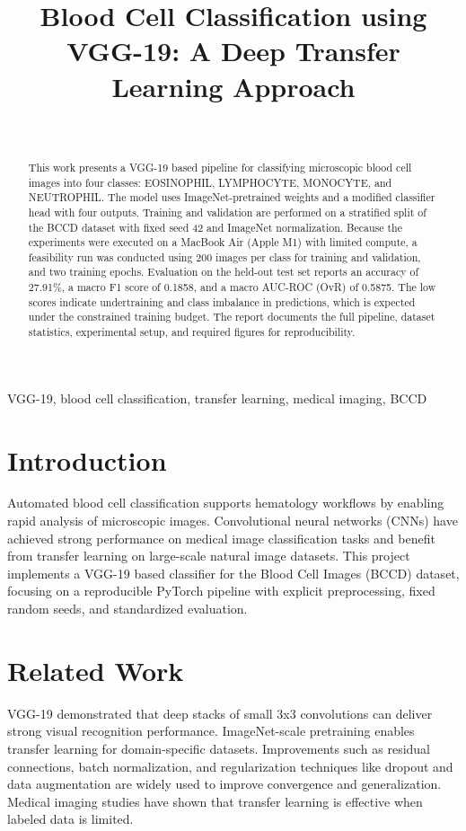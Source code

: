 \documentclass[conference]{IEEEtran}
\title{Blood Cell Classification using VGG-19: A Deep Transfer Learning Approach}
\author{\IEEEauthorblockN{Aman Verma (23bcs012), Ankit Kashyap (23bcs017), Abhishek Chauhan (23bcs003)}\\
\IEEEauthorblockA{School of Computer science and Engineering\\
Shri Mata Vaishno Devi University\\
info@smvdu.ac.in}}
\begin{document}
\maketitle

\begin{abstract}
This work presents a VGG-19 based pipeline for classifying microscopic blood cell images into four classes: EOSINOPHIL, LYMPHOCYTE, MONOCYTE, and NEUTROPHIL. The model uses ImageNet-pretrained weights and a modified classifier head with four outputs. Training and validation are performed on a stratified split of the BCCD dataset with fixed seed 42 and ImageNet normalization. Because the experiments were executed on a MacBook Air (Apple M1) with limited compute, a feasibility run was conducted using 200 images per class for training and validation, and two training epochs. Evaluation on the held-out test set reports an accuracy of 27.91\%, a macro F1 score of 0.1858, and a macro AUC-ROC (OvR) of 0.5875. The low scores indicate undertraining and class imbalance in predictions, which is expected under the constrained training budget. The report documents the full pipeline, dataset statistics, experimental setup, and required figures for reproducibility.
\end{abstract}

\begin{IEEEkeywords}
VGG-19, blood cell classification, transfer learning, medical imaging, BCCD
\end{IEEEkeywords}

\section{Introduction}
Automated blood cell classification supports hematology workflows by enabling rapid analysis of microscopic images. Convolutional neural networks (CNNs) have achieved strong performance on medical image classification tasks and benefit from transfer learning on large-scale natural image datasets. This project implements a VGG-19 based classifier for the Blood Cell Images (BCCD) dataset, focusing on a reproducible PyTorch pipeline with explicit preprocessing, fixed random seeds, and standardized evaluation.

\section{Related Work}
VGG-19 demonstrated that deep stacks of small 3x3 convolutions can deliver strong visual recognition performance. ImageNet-scale pretraining enables transfer learning for domain-specific datasets. Improvements such as residual connections, batch normalization, and regularization techniques like dropout and data augmentation are widely used to improve convergence and generalization. Medical imaging studies have shown that transfer learning is effective when labeled data is limited.
\end{document}
